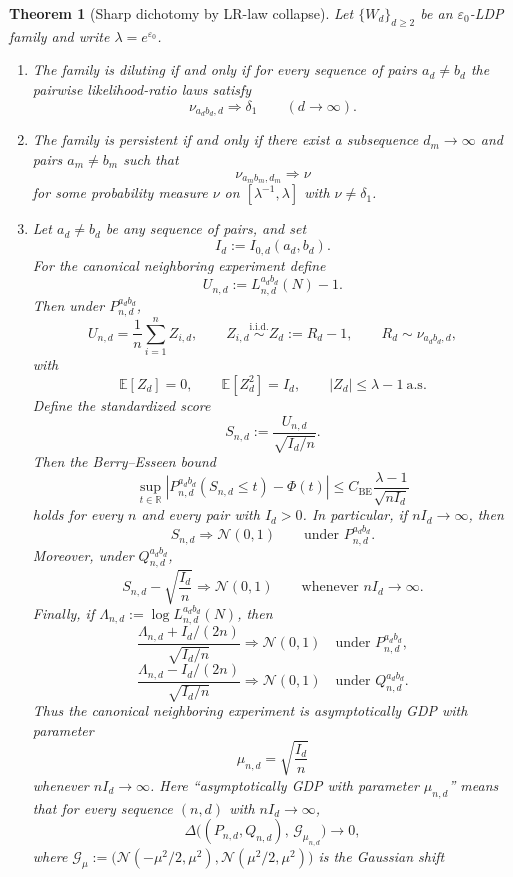 \documentclass[11pt]{amsart}
\numberwithin{equation}{section}
\newtheorem{theorem}{Theorem}[section]
\theoremstyle{definition}
\newcommand{\R}{\mathbb R}
\newcommand{\E}{\mathbb E}
\newcommand{\iid}{\stackrel{\mathrm{i.i.d.}}{\sim}}
\newcommand{\LeCam}{\Delta}
\newcommand{\Normal}{\mathcal N}
\begin{document}
\begin{theorem}[Sharp dichotomy by LR-law collapse]\label{thm:dichotomy}
Let $\{W_d\}_{d\ge2}$ be an $\varepsilon_0$-LDP family and write $\lambda=e^{\varepsilon_0}$.

\begin{enumerate}
\item The family is diluting if and only if for every sequence of pairs
\(
a_d\neq b_d
\)
the pairwise likelihood-ratio laws satisfy
\[
\nu_{a_db_d,d}\Rightarrow \delta_1
\qquad (d\to\infty).
\]
\item The family is persistent if and only if there exist a subsequence $d_m\to\infty$ and pairs
\(
a_m\neq b_m
\)
such that
\[
\nu_{a_m b_m,d_m}\Rightarrow \nu
\]
for some probability measure $\nu$ on $[\lambda^{-1},\lambda]$ with $\nu\neq \delta_1$.
\item Let $a_d\neq b_d$ be any sequence of pairs, and set
\[
I_d:=I_{0,d}(a_d,b_d).
\]
For the canonical neighboring experiment define
\[
U_{n,d}:=L_{n,d}^{a_d b_d}(N)-1.
\]
Then under $P_{n,d}^{a_d b_d}$,
\[
U_{n,d}
=
\frac1n\sum_{i=1}^n Z_{i,d},
\qquad
Z_{i,d}\iid Z_d:=R_d-1,
\qquad
R_d\sim \nu_{a_d b_d,d},
\]
with
\[
\E[Z_d]=0,\qquad \E[Z_d^2]=I_d,\qquad |Z_d|\le \lambda-1 \ \text{a.s.}
\]
Define the standardized score
\[
S_{n,d}:=\frac{U_{n,d}}{\sqrt{I_d/n}}.
\]
Then the Berry--Esseen bound
\[
\sup_{t\in\R}\left|
P_{n,d}^{a_d b_d}(S_{n,d}\le t)-\Phi(t)
\right|
\le
C_{\mathrm{BE}}\frac{\lambda-1}{\sqrt{n I_d}} \tag{6.1}\label{eq:BE-null}
\]
holds for every $n$ and every pair with $I_d>0$.
In particular, if \( n I_d\to\infty \), then
\[
S_{n,d}\Rightarrow \Normal(0,1)
\qquad\text{under }P_{n,d}^{a_d b_d}. \tag{6.2}\label{eq:null-clt}
\]
Moreover, under $Q_{n,d}^{a_d b_d}$,
\[
S_{n,d}-\sqrt{\frac{I_d}{n}}
\Rightarrow \Normal(0,1) \qquad\text{whenever } nI_d\to\infty. \tag{6.3}\label{eq:alt-clt}
\]
Finally, if
\(
\Lambda_{n,d}:=\log L_{n,d}^{a_d b_d}(N)
\),
then
\[
\frac{\Lambda_{n,d}+I_d/(2n)}{\sqrt{I_d/n}}
\Rightarrow \Normal(0,1)
\quad\text{under }P_{n,d}^{a_d b_d}, \tag{6.4}\label{eq:LAN-null}
\]
\[
\frac{\Lambda_{n,d}-I_d/(2n)}{\sqrt{I_d/n}}
\Rightarrow \Normal(0,1)
\quad\text{under }Q_{n,d}^{a_d b_d}. \tag{6.5}\label{eq:LAN-alt}
\]
Thus the canonical neighboring experiment is asymptotically GDP with parameter
\[
\mu_{n,d}=\sqrt{\frac{I_d}{n}}
\]
whenever \( nI_d\to\infty \).
Here ``asymptotically GDP with parameter $\mu_{n,d}$'' means that
for every sequence $(n,d)$ with $nI_d\to\infty$,
\[
\LeCam\!\bigl((P_{n,d},Q_{n,d}),\,\mathcal G_{\mu_{n,d}}\bigr)\to 0,
\]
where $\mathcal G_\mu:=\bigl(\Normal(-\mu^2/2,\mu^2),\Normal(\mu^2/2,\mu^2)\bigr)$ is the Gaussian shift

\end{enumerate}
\end{theorem}
\end{document}
